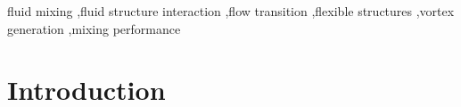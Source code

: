 \documentclass[reprint,a4paper,fleqn]{cas-dc} %
\begin{document}
\begin{abstract}
		
	\end{abstract}
	
	
	
	
	\begin{keywords}
		fluid mixing \sep fluid structure interaction \sep flow transition \sep flexible structures \sep vortex generation \sep mixing performance
	\end{keywords}
	
	\maketitle
	
	\section{Introduction}
	\label{sec:headings}
	
\end{document}
